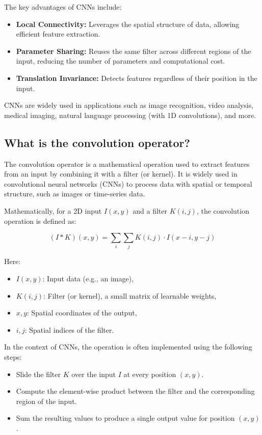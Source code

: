 The key advantages of CNNs include:

\begin{itemize}
    \item \textbf{Local Connectivity:} Leverages the spatial structure of data, allowing efficient feature extraction.
    \item \textbf{Parameter Sharing:} Reuses the same filter across different regions of the input, reducing the number of parameters and computational cost.
    \item \textbf{Translation Invariance:} Detects features regardless of their position in the input.
\end{itemize}

CNNs are widely used in applications such as image recognition, video analysis, medical imaging, natural language processing (with 1D convolutions), and more.

\subsection{What is the convolution operator?}

The convolution operator is a mathematical operation used to extract features from an input by combining it with a filter (or kernel). It is widely used in convolutional neural networks (CNNs) to process data with spatial or temporal structure, such as images or time-series data.

Mathematically, for a 2D input \( I(x, y) \) and a filter \( K(i, j) \), the convolution operation is defined as:

\[
(I * K)(x, y) = \sum_{i} \sum_{j} K(i, j) \cdot I(x - i, y - j)
\]

Here:
\begin{itemize}
    \item \( I(x, y) \): Input data (e.g., an image),
    \item \( K(i, j) \): Filter (or kernel), a small matrix of learnable weights,
    \item \( x, y \): Spatial coordinates of the output,
    \item \( i, j \): Spatial indices of the filter.
\end{itemize}

In the context of CNNs, the operation is often implemented using the following steps:

\begin{itemize}
    \item Slide the filter \( K \) over the input \( I \) at every position \((x, y)\).
    \item Compute the element-wise product between the filter and the corresponding region of the input.
    \item Sum the resulting values to produce a single output value for position \((x, y)\).
\end{itemize}

